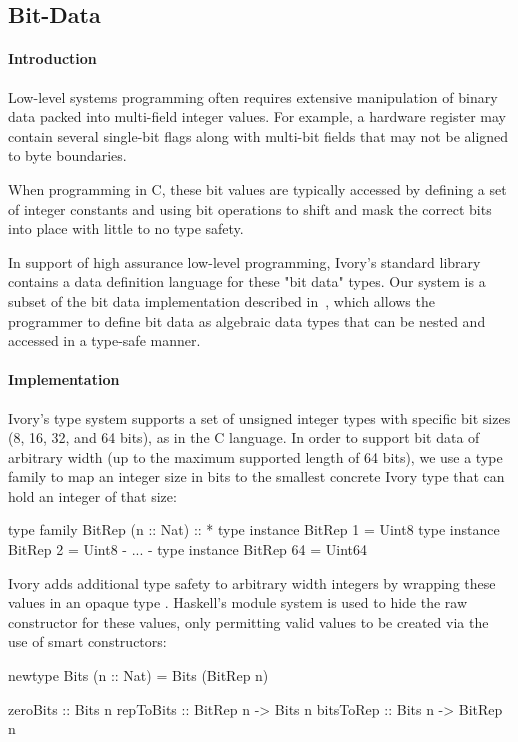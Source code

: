 \subsection{Bit-Data}
\label{sec:bitdata}

\paragraph{Introduction}
Low-level systems programming often requires extensive manipulation
of binary data packed into multi-field integer values. For example,
a hardware register may contain several single-bit flags along with
multi-bit fields that may not be aligned to byte boundaries.

When programming in C, these bit values are typically accessed by
defining a set of integer constants and using bit operations to
shift and mask the correct bits into place with little to no type
safety.

In support of high assurance low-level programming, Ivory's standard
library contains a data definition language for these "bit data"
types. Our system is a subset of the bit data implementation
described in~\cite{high-level},
which allows the programmer to define bit data as algebraic data
types that can be nested and accessed in a type-safe manner.

\paragraph{Implementation}
Ivory's type system supports a set of unsigned integer types with
specific bit sizes (8, 16, 32, and 64 bits), as in the C language.
In order to support bit data of arbitrary width (up to the maximum
supported length of 64 bits), we use a type family
 to map an integer size in bits to the smallest
concrete Ivory type that can hold an integer of that size:

\begin{code}
type family BitRep (n :: Nat) :: *
type instance BitRep 1 = Uint8
type instance BitRep 2 = Uint8
{- ... -}
type instance BitRep 64 = Uint64
\end{code}

Ivory adds additional type safety to arbitrary width integers by
wrapping these values in an opaque type .
Haskell's module system is used to hide the raw constructor for
these values, only permitting valid values to be created via the
use of smart constructors:

\begin{code}
newtype Bits (n :: Nat) = Bits (BitRep n)

zeroBits :: Bits n
repToBits :: BitRep n -> Bits n
bitsToRep :: Bits n -> BitRep n
\end{code}

